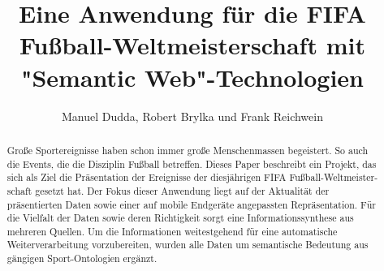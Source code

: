 \documentclass[runningheads,a4paper]{llncs}
\author{Manuel Dudda, Robert Brylka und Frank Reichwein}
\begin{document}
\mainmatter  %

\title{Eine Anwendung für die FIFA Fußball-Weltmeisterschaft mit "{}Semantic Web"{}-Technologien}


%


%
%

\maketitle


\begin{abstract}
Große Sportereignisse haben schon immer große Menschenmassen begeistert. So auch die Events, die die Disziplin Fußball betreffen. Dieses Paper beschreibt ein Projekt, das sich als Ziel die Präsentation der Ereignisse der diesjährigen FIFA Fußball-Weltmeister-schaft gesetzt hat. Der Fokus dieser Anwendung liegt auf der Aktualität der präsentierten Daten sowie einer auf mobile Endgeräte angepassten Repräsentation. Für die Vielfalt der Daten sowie deren Richtigkeit sorgt eine Informationssynthese aus mehreren Quellen. Um die Informationen weitestgehend für eine automatische Weiterverarbeitung vorzubereiten, wurden alle Daten um semantische Bedeutung aus gängigen Sport-Ontologien ergänzt.
\end{abstract}
\end{document}
